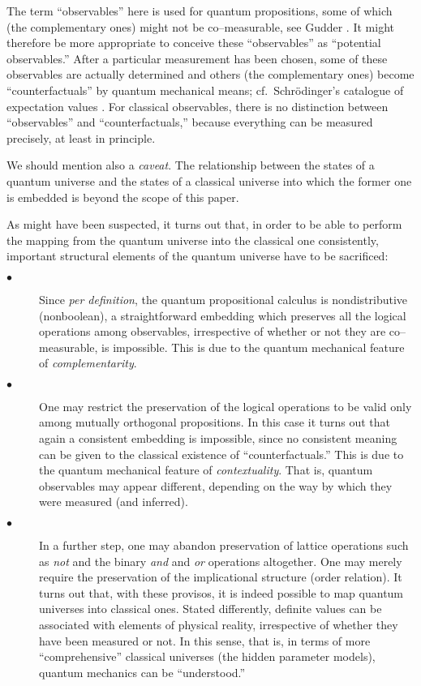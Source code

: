 The term ``observables'' here is used for quantum propositions, some of
which (the complementary ones) might not be co--measurable,
see Gudder \cite{gudder1}.
It might
therefore be more appropriate to conceive these ``observables'' as
``potential observables.'' After a particular measurement has been
chosen, some of these observables are actually determined and others
(the complementary ones) become
``counterfactuals''  by quantum mechanical means; cf.\
Schr\"odinger's catalogue of expectation values
\cite[p.\ 823]{schrodinger}. For classical observables, there
is no distinction between ``observables'' and ``counterfactuals,''
because everything can be measured precisely, at least in principle.


We should mention also a {\it caveat}. The relationship between the
states of a quantum universe and the states of a classical universe into
which the former one is embedded is beyond the scope of this paper.

As might have been suspected, it turns out that, in order
to be able
to perform the mapping from the quantum universe into the classical one
consistently, important
structural elements of the quantum universe have to be sacrificed:
%
\begin{description}
\item[$\bullet$]
Since {\it per definition}, the quantum propositional calculus is
nondistributive (nonboolean), a straightforward embedding which
preserves all the logical operations among observables, irrespective of
whether or not they are co--measurable, is impossible.
This is due to the quantum mechanical feature of {\em complementarity}.
\item[$\bullet$]
One may restrict the preservation of the logical operations to be valid
only among mutually orthogonal propositions.
In this case it turns out that again
a consistent embedding is impossible, since no consistent meaning can be
given to the classical existence of ``counterfactuals.''
This is due to the quantum mechanical feature of {\em contextuality}.
That is,  quantum observables may appear different, depending on the way
by which they were measured (and inferred).
\item[$\bullet$]
In a further step, one may abandon preservation of lattice operations
such as {\it not} and the binary
{\it and} and
{\it or} operations altogether. One may merely require the preservation
of the
implicational structure (order relation). It
turns out that, with these provisos, it is indeed possible to map
quantum universes into classical ones. Stated differently, definite
values can be associated with elements of physical reality, irrespective
of whether they have been measured or not.
In this sense, that is, in terms of more
``comprehensive'' classical universes (the hidden parameter models),
 quantum mechanics can be ``understood.''
\end{description}

